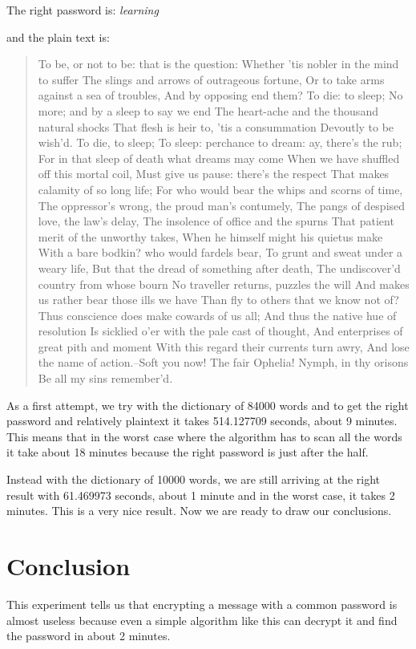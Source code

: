 \documentclass[11pt]{article}
\begin{document}
The right password is: {\em learning}

and the plain text is:
\begin{quote}
To be, or not to be: that is the question:
Whether 'tis nobler in the mind to suffer
The slings and arrows of outrageous fortune,
Or to take arms against a sea of troubles,
And by opposing end them? To die: to sleep;
No more; and by a sleep to say we end
The heart-ache and the thousand natural shocks
That flesh is heir to, 'tis a consummation
Devoutly to be wish'd. To die, to sleep;
To sleep: perchance to dream: ay, there's the rub;
For in that sleep of death what dreams may come
When we have shuffled off this mortal coil,
Must give us pause: there's the respect
That makes calamity of so long life;
For who would bear the whips and scorns of time,
The oppressor's wrong, the proud man's contumely,
The pangs of despised love, the law's delay,
The insolence of office and the spurns
That patient merit of the unworthy takes,
When he himself might his quietus make
With a bare bodkin? who would fardels bear,
To grunt and sweat under a weary life,
But that the dread of something after death,
The undiscover'd country from whose bourn
No traveller returns, puzzles the will
And makes us rather bear those ills we have
Than fly to others that we know not of?
Thus conscience does make cowards of us all;
And thus the native hue of resolution
Is sicklied o'er with the pale cast of thought,
And enterprises of great pith and moment
With this regard their currents turn awry,
And lose the name of action.--Soft you now!
The fair Ophelia! Nymph, in thy orisons
Be all my sins remember'd.
\end{quote}

As a first attempt, we try with the dictionary of 84000 words and to get the right password and relatively plaintext it takes 514.127709 seconds, about 9 minutes. This means that in the worst case where the algorithm has to scan all the words it take about 18 minutes because the right password is just after the half.

Instead with the dictionary of 10000 words, we are still arriving at the right result with 61.469973 seconds, about 1 minute and in the worst case, it takes 2 minutes. This is a very nice result. Now we are ready to draw our conclusions.

\section{Conclusion}
This experiment tells us that encrypting a message with a common password is almost useless because even a simple algorithm like this can decrypt it and find the password in about 2 minutes.
\end{document}
